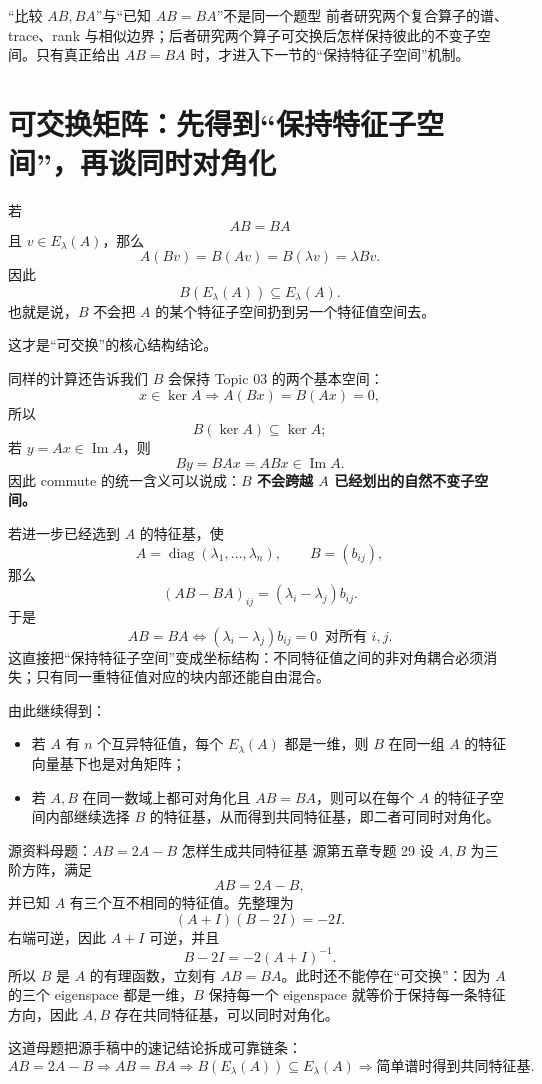 \documentclass[11pt,a4paper]{ctexart}
\newcommand{\kw}[1]{\textbf{\color{deep}#1}}
\begin{document}
\begin{warnbox}{“比较 $AB,BA$”与“已知 $AB=BA$”不是同一个题型}
前者研究两个复合算子的谱、trace、rank 与相似边界；后者研究两个算子可交换后怎样保持彼此的不变子空间。只有真正给出 $AB=BA$ 时，才进入下一节的“保持特征子空间”机制。
\end{warnbox}

\section{可交换矩阵：先得到“保持特征子空间”，再谈同时对角化}

若
\[
AB=BA
\]
且 $v\in E_\lambda(A)$，那么
\[
A(Bv)=B(Av)=B(\lambda v)=\lambda Bv.
\]
因此
\[
\boxed{B(E_\lambda(A))\subseteq E_\lambda(A).}
\]
也就是说，$B$ 不会把 $A$ 的某个特征子空间扔到另一个特征值空间去。

这才是“可交换”的核心结构结论。

同样的计算还告诉我们 $B$ 会保持 Topic 03 的两个基本空间：
\[
x\in\ker A
\Rightarrow
A(Bx)=B(Ax)=0,
\]
所以
\[
B(\ker A)\subseteq\ker A;
\]
若 $y=Ax\in\operatorname{Im}A$，则
\[
By=BAx=ABx\in\operatorname{Im}A.
\]
因此 commute 的统一含义可以说成：\kw{$B$ 不会跨越 $A$ 已经划出的自然不变子空间。}

若进一步已经选到 $A$ 的特征基，使
\[
A=\operatorname{diag}(\lambda_1,\dots,\lambda_n),
\qquad B=(b_{ij}),
\]
那么
\[
(AB-BA)_{ij}=(\lambda_i-\lambda_j)b_{ij}.
\]
于是
\[
\boxed{AB=BA\iff(\lambda_i-\lambda_j)b_{ij}=0\ \text{ 对所有 }i,j.}
\]
这直接把“保持特征子空间”变成坐标结构：不同特征值之间的非对角耦合必须消失；只有同一重特征值对应的块内部还能自由混合。

由此继续得到：
\begin{itemize}
  \item 若 $A$ 有 $n$ 个互异特征值，每个 $E_\lambda(A)$ 都是一维，则 $B$ 在同一组 $A$ 的特征向量基下也是对角矩阵；
  \item 若 $A,B$ 在同一数域上都可对角化且 $AB=BA$，则可以在每个 $A$ 的特征子空间内部继续选择 $B$ 的特征基，从而得到共同特征基，即二者可同时对角化。
\end{itemize}

\begin{examplebox}{源资料母题：$AB=2A-B$ 怎样生成共同特征基}
源第五章专题 29 设 $A,B$ 为三阶方阵，满足
\[
AB=2A-B,
\]
并已知 $A$ 有三个互不相同的特征值。先整理为
\[
(A+I)(B-2I)=-2I.
\]
右端可逆，因此 $A+I$ 可逆，并且
\[
B-2I=-2(A+I)^{-1}.
\]
所以 $B$ 是 $A$ 的有理函数，立刻有 $AB=BA$。此时还不能停在“可交换”：因为 $A$ 的三个 eigenspace 都是一维，$B$ 保持每一个 eigenspace 就等价于保持每一条特征方向，因此 $A,B$ 存在共同特征基，可以同时对角化。

这道母题把源手稿中的速记结论拆成可靠链条：
\[
AB=2A-B
\Longrightarrow AB=BA
\Longrightarrow B(E_\lambda(A))\subseteq E_\lambda(A)
\Longrightarrow \text{简单谱时得到共同特征基}.
\]
\end{examplebox}
\end{document}
